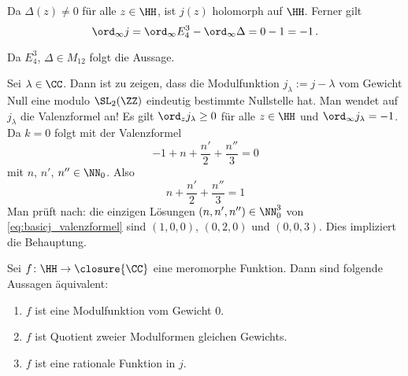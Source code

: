 \begin{bewe-list}
	\item  Da $\Delta(z) \not= 0$ für alle $z\in\HH$, ist $j(z)$ holomorph auf $\HH$.
	Ferner gilt
	\[
		\ord_\infty j = \ord_\infty E_4^3 - \ord_\infty \Delta = 0 - 1 = -1
		\,.
	\]
	\item Da $E_4^3$, $\Delta \in M_{12}$ folgt die Aussage.
	\item Sei $\lambda \in \CC$. Dann ist zu zeigen, dass die Modulfunktion $j_\lambda := j - \lambda$ vom Gewicht Null eine modulo $\SL_2(\ZZ)$ eindeutig bestimmte Nullstelle hat.
	Man wendet auf $j_\lambda$ die Valenzformel an!
	Es gilt $\ord_z j_\lambda \geq 0$ für alle $z\in\HH$ und $\ord_\infty j_\lambda = -1$.
	Da $k = 0$ folgt mit der Valenzformel
	\[
		-1 + n + \frac{n'}{2} + \frac{n''}{3} = 0
	\]
	mit $n$, $n'$, $n'' \in \NN_0$.
	Also
	\begin{equation}\label{eq:basicj_valenzformel}
		n + \frac{n'}{2} + \frac{n''}{3} = 1
	\end{equation}
	Man prüft nach: die einzigen Lösungen $(n,n',n'') \in \NN_0^3$ von \eqref{eq:basicj_valenzformel} sind $(1,0,0)$, $(0,2,0)$ und $(0,0,3)$.
	Dies impliziert die Behauptung.
\end{bewe-list}

\begin{satz}\label{satz:charakterisierung_modulfunktion_0}
	Sei $f\colon \HH \to \closure{\CC}$ eine meromorphe Funktion. Dann sind folgende Aussagen äquivalent:
	\begin{enumerate}
		\item $f$ ist eine Modulfunktion vom Gewicht 0.
		\item $f$ ist Quotient zweier Modulformen gleichen Gewichts.
		\item $f$ ist eine rationale Funktion in $j$.
	\end{enumerate}
\end{satz}


